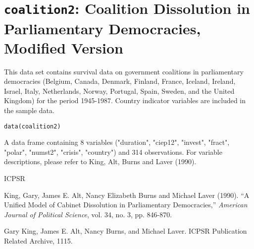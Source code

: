  \section{{\tt coalition2}: Coalition Dissolution in Parliamentary Democracies, Modified Version}\label{ss:coalition2}
\begin{Description}\relax
This data set contains survival data on government coalitions in
parliamentary democracies (Belgium, Canada, Denmark, Finland, France,
Iceland, Ireland, Israel, Italy, Netherlands, Norway, Portugal, Spain,
Sweden, and the United Kingdom) for the period 1945-1987.  Country indicator variables are included in the sample data.
\end{Description}
\begin{Usage}
\begin{verbatim}data(coalition2)\end{verbatim}
\end{Usage}
\begin{Format}\relax
A data frame containing 8 variables ("duration", "ciep12", "invest",
"fract", "polar", "numst2", "crisis", "country") and 314 observations.  For
variable descriptions, please refer to King, Alt, Burns and Laver
(1990).
\end{Format}
\begin{Source}\relax
ICPSR
\end{Source}
\begin{References}\relax
King, Gary, James E. Alt, Nancy Elizabeth Burns and Michael Laver (1990).
``A Unified Model  of Cabinet Dissolution in Parliamentary
Democracies,'' \emph{American Journal of Political Science}, vol. 34,
no. 3, pp. 846-870.  

Gary King, James E. Alt, Nancy Burns, and Michael Laver.  ICPSR
Publication Related Archive, 1115.
\end{References}


